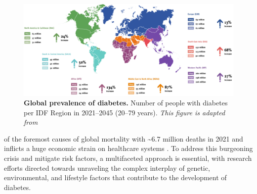 \begin{figure}[H]
\centering
\includegraphics[width=\linewidth]{Chapter1/Fig/F1-3-01.png}
\caption[Global prevalence of diabetes]{\textbf{Global prevalence of diabetes.} Number of people with diabetes per IDF Region in 2021–2045 (20–79 years). \textit{This figure is adapted from \textbf{\cite{home_idf_nodate}}}}
\label{fig:chp1_idf}
\end{figure}

of the foremost causes of global mortality with \textasciitilde6.7 million deaths in 2021 and inflicts a huge economic strain on healthcare systems  \textbf{\cite{home_idf_nodate}}. To address this burgeoning crisis and mitigate risk factors, a multifaceted approach is essential, with research efforts directed towards unraveling the complex interplay of genetic, environmental, and lifestyle factors that contribute to the development of diabetes.\\


